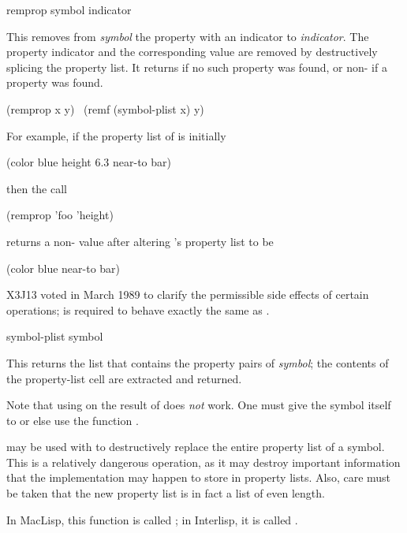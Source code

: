 \begin{defun}[Function]
remprop symbol indicator

This removes from \emph{symbol} the property with an indicator 
to \emph{indicator}.  The property indicator and the corresponding
value are removed by destructively splicing the property
list.  It returns {\false} if no such property was found,
or non-{\false} if a property was found.
\begin{lisp}
(remprop x y) \EQ\ (remf (symbol-plist x) y)
\end{lisp}
For example, if the property list of  is initially
\begin{lisp}
(color blue height 6.3 near-to bar)
\end{lisp}
then the call
\begin{lisp}
(remprop 'foo 'height)
\end{lisp}
returns a non-{\nil} value after altering 's property list to be
\begin{lisp}
(color blue near-to bar)
\end{lisp}

\begin{newer}
X3J13 voted in March 1989 
to clarify the permissible side effects of certain operations;
is required to behave exactly the same as
.
\end{newer}
\end{defun}

\begin{defun}[Function]
symbol-plist symbol

This returns the list that contains the property pairs of \emph{symbol};
the contents of the property-list cell are extracted and returned.

Note that using  on the result of  does \emph{not} work.
One must give the symbol itself to  or else
use the function .

 may be used with  to destructively replace
the entire property list of a symbol.  This is a relatively dangerous
operation, as it may destroy important information that
the implementation may happen to store in property lists.
Also, care must be taken that the new
property list is in fact a list of even length.
\beforenoterule
\begin{incompatibility}
In MacLisp, this function is called ;
in Interlisp, it is called .
\end{incompatibility}
\afternoterule
\end{defun}

